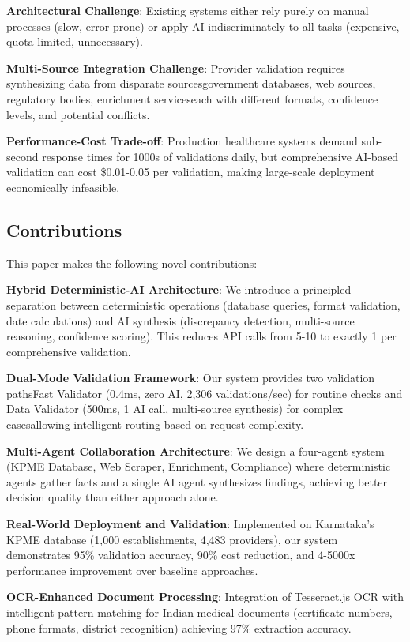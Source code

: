 \documentclass[conference]{IEEEtran}
\begin{document}
\textbf{Architectural Challenge}: Existing systems either rely purely on manual processes (slow, error-prone) or apply AI indiscriminately to all tasks (expensive, quota-limited, unnecessary).

\textbf{Multi-Source Integration Challenge}: Provider validation requires synthesizing data from disparate sourcesgovernment databases, web sources, regulatory bodies, enrichment serviceseach with different formats, confidence levels, and potential conflicts.

\textbf{Performance-Cost Trade-off}: Production healthcare systems demand sub-second response times for 1000s of validations daily, but comprehensive AI-based validation can cost \$0.01-0.05 per validation, making large-scale deployment economically infeasible.

\subsection{Contributions}

This paper makes the following novel contributions:

\textbf{Hybrid Deterministic-AI Architecture}: We introduce a principled separation between deterministic operations (database queries, format validation, date calculations) and AI synthesis (discrepancy detection, multi-source reasoning, confidence scoring). This reduces API calls from 5-10 to exactly 1 per comprehensive validation.

\textbf{Dual-Mode Validation Framework}: Our system provides two validation pathsFast Validator (0.4ms, zero AI, 2,306 validations/sec) for routine checks and Data Validator (500ms, 1 AI call, multi-source synthesis) for complex casesallowing intelligent routing based on request complexity.

\textbf{Multi-Agent Collaboration Architecture}: We design a four-agent system (KPME Database, Web Scraper, Enrichment, Compliance) where deterministic agents gather facts and a single AI agent synthesizes findings, achieving better decision quality than either approach alone.

\textbf{Real-World Deployment and Validation}: Implemented on Karnataka's KPME database (1,000 establishments, 4,483 providers), our system demonstrates 95\% validation accuracy, 90\% cost reduction, and 4-5000x performance improvement over baseline approaches.

\textbf{OCR-Enhanced Document Processing}: Integration of Tesseract.js OCR with intelligent pattern matching for Indian medical documents (certificate numbers, phone formats, district recognition) achieving 97\% extraction accuracy.
\end{document}
